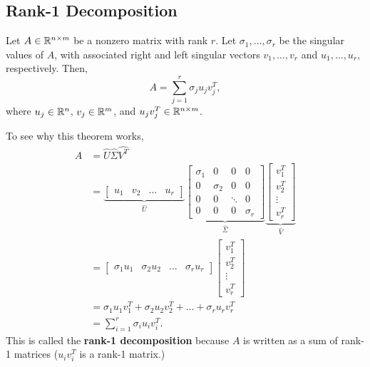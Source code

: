 \documentclass[letterpaper]{article}
\newcommand{\0}{\mathbf{0}}
\begin{document}
\subsection{Rank-1 Decomposition}
\begin{theorem}{}{}
    Let $A \in \mathbb{R}^{n \times m}$ be a nonzero matrix with rank $r$. Let $\sigma_1, \hdots, \sigma_r$ be the singular values of $A$, with associated right and left singular vectors $v_1, \hdots, v_r$ and $u_1, \hdots, u_r$, respectively. Then, 
    \[A = \sum_{j = 1}^{r} \sigma_j u_j v_j^T,\]
    where $u_j \in \mathbb{R}^{n}$, $v_j \in \mathbb{R}^{m}$, and $u_j v_j^T \in \mathbb{R}^{n \times m}$. 
\end{theorem}
To see why this theorem works, 
\begin{equation*}
    \begin{aligned}
        A &= \hat{U}\hat{\Sigma}\hat{V^T} \\ 
            &= \underbrace{\begin{bmatrix}
                u_1 & v_2 & \hdots & u_r
            \end{bmatrix}}_{\hat{U}} \underbrace{\begin{bmatrix}
                \sigma_1 & 0 & 0 & 0 \\ 
                0 & \sigma_2 & 0 & 0 \\ 
                0 & 0 & \ddots & 0 \\ 
                0 & 0 & 0 & \sigma_r
            \end{bmatrix}}_{\hat{\Sigma}} \underbrace{\begin{bmatrix}
                v_1^T \\ v_2^T \\ \vdots \\ v_r^T
            \end{bmatrix}}_{\hat{V}} \\ 
            &= \begin{bmatrix}
                \sigma_1 u_1 & \sigma_2 u_2 & \hdots & \sigma_r u_r
            \end{bmatrix} \begin{bmatrix}
                v_1^T \\ v_2^T \\ \vdots \\ v_r^T
            \end{bmatrix} \\ 
            &= \sigma_1 u_1 v_1^T + \sigma_2 u_2 v_2^T + \hdots + \sigma_r u_r v_r^T \\ 
            &= \sum_{i = 1}^{r} \sigma_i u_i v_{i}^T.
    \end{aligned}
\end{equation*}
This is called the \textbf{rank-1 decomposition} because $A$ is written as a sum of rank-1 matrices ($u_i v_i^T$ is a rank-1 matrix.)
\end{document}
